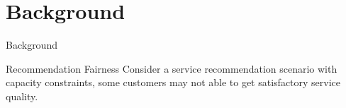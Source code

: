 \section{Background}

\begin{frame}{Background}%
\begin{block}{Recommendation Fairness}
Consider a service recommendation scenario with capacity constraints, 
some customers may not able to get satisfactory service quality.
\end{block}

\begin{figure}[H]
  \centering
  \hspace{0.2in}
\end{figure}


\end{frame}

